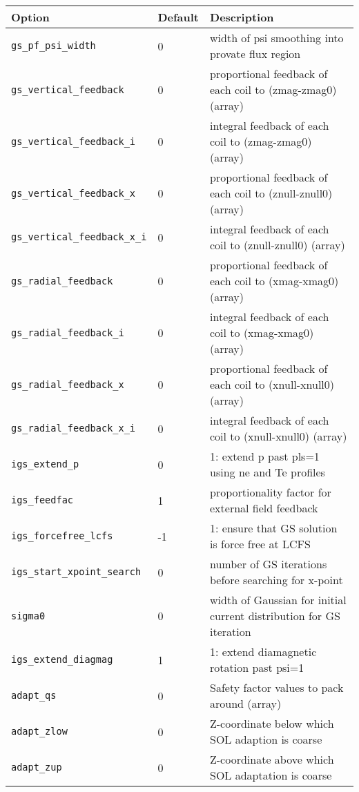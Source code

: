   \begin{tabular}{llp{4.0in}}
  \textbf{Option}&\textbf{Default}&\textbf{Description}\\
  \hline
 \texttt{gs\_pf\_psi\_width}            & 0 & width of psi smoothing into provate flux region \\
 \texttt{gs\_vertical\_feedback}        & 0 & proportional feedback of each coil to (zmag-zmag0) (array) \\ 
 \texttt{gs\_vertical\_feedback\_i}     & 0 & integral feedback of each coil to (zmag-zmag0) (array) \\
 \texttt{gs\_vertical\_feedback\_x}     & 0 & proportional feedback of each coil to (znull-znull0) (array) \\
 \texttt{gs\_vertical\_feedback\_x\_i} & 0 & integral feedback of each coil to (znull-znull0) (array) \\
 \texttt{gs\_radial\_feedback}          & 0 & proportional feedback of each coil to (xmag-xmag0) (array) \\
 \texttt{gs\_radial\_feedback\_i}       & 0 & integral feedback of each coil to (xmag-xmag0) (array) \\
 \texttt{gs\_radial\_feedback\_x}       & 0 & proportional feedback of each coil to (xnull-xnull0) (array) \\
 \texttt{gs\_radial\_feedback\_x\_i}    & 0 & integral feedback of each coil to (xnull-xnull0) (array) \\
 \texttt{igs\_extend\_p}                & 0 & 1: extend p past pls=1 using ne and Te profiles  \\
 \texttt{igs\_feedfac}                  & 1 & proportionality factor for external field feedback \\
 \texttt{igs\_forcefree\_lcfs}          & -1 & 1: ensure that GS solution is force free at LCFS \\
 \texttt{igs\_start\_xpoint\_search}    & 0 &  number of GS iterations before searching for x-point \\
 \texttt{sigma0}                        & 0 &  width of Gaussian for initial current distribution for GS iteration \\
 \texttt{igs\_extend\_diagmag}          & 1 &  1: extend diamagnetic rotation past psi=1 \\
 
\texttt{adapt\_qs} & 0 & Safety factor values to pack around (array) \\
\texttt{adapt\_zlow} & 0 & Z-coordinate below which SOL adaption is coarse \\
\texttt{adapt\_zup}  & 0 & Z-coordinate above which SOL adaptation is coarse


\end{tabular}



